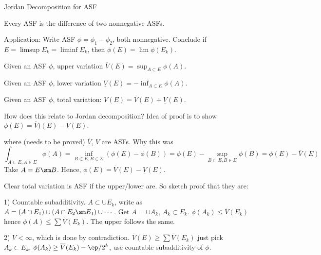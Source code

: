 Jordan Decomposition for ASF 

Every ASF is the difference of two nonnegative ASFs. 

Application: Write ASF $\phi = \phi_1 - \phi_2$, both nonnegative. Conclude if $E= \limsup E_k= \liminf E_k$, then $\phi(E)= \lim \phi(E_k)$. 


\begin{dfn}
Given an ASF $\phi$, upper variation $\overline{V}(E)= \sup_{A \subset E} \phi(A)$. 
\end{dfn}

\begin{dfn}
Given an ASF $\phi$, lower variation $\underline{V}(E)= - \inf_{A \subset E} \phi(A)$. 
\end{dfn}

\begin{dfn}
Given an ASF $\phi$, total variation: $V(E)= \overline{V}(E) + \underline{V}(E)$.
\end{dfn}

How does this relate to Jordan decomposition? Idea of proof is to show $\phi(E)= \overline{V})(E) - \underline{V}(E)$. 

where (needs to be proved) $\overline{V}$, $\underline{V}$ are ASFs. Why this was
	\[
	\int_{A \subset E, A \in \Sigma} \phi(A) = \inf_{B \subset E, B \in \Sigma} (\phi(E) - \phi(B)) = \phi(E) - \sup_{B \subset E, B \in \Sigma} \phi(B) = \phi(E) - \overline{V}(E)
	\]
Take $A= E \sm B$. Hence, $\phi(E)= \overline{V}(E) - \underline{V}(E)$. 


Clear total variation is ASF if the upper/lower are. So sketch proof that they are:

1) Countable subadditivity. 
$A \subset \cup E_k$, write as $A= (A \cap E_1) \cup (A \cap E_2 \sm E_1) \cup \cdots$. Get $A= \cup A_k$, $A_k \subset E_k$. $\phi(A_k) \leq \overline{V}(E_k)$ hence $\phi(A) \leq \sum \overline{V} (E_k)$. The upper follows the same.

2) $V< \infty$, which is done by contradiction. 
$\overline{V}(E) \geq \sum \overline{V}(E_k)$ just pick $A_k \subset E_k$, $\phi(A_k) \geq \overline{V}(E_k) - \ep/2^k$, use countable subadditivity of $\phi$. 






















